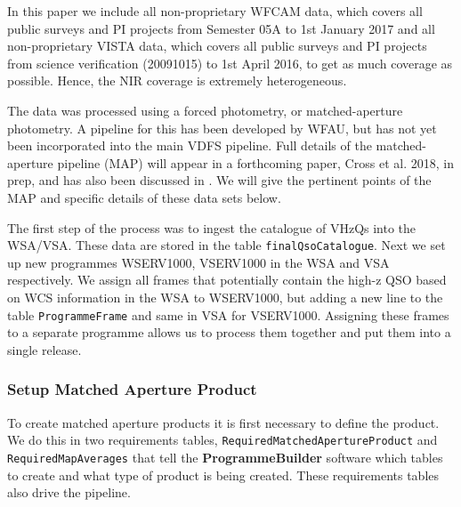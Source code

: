 \documentclass[usenatbib]{mnras}
\begin{document}
In this paper we include all non-proprietary WFCAM data, which covers all
public surveys and PI projects from Semester 05A to 1st January 2017 and all
non-proprietary VISTA data, which covers all public surveys and PI projects from
science verification (20091015) to 1st April 2016, to get as much coverage as
possible. Hence, the NIR coverage is extremely heterogeneous. 

The data was processed using a forced photometry, or matched-aperture
photometry. A pipeline for this has been developed by WFAU, but
has not yet been incorporated into the main VDFS pipeline. Full details of the
matched-aperture pipeline (MAP) will appear in a forthcoming paper, Cross et al.
2018, in prep, and has also been discussed in \citet{Cross2013}.  
We will give the pertinent points of the MAP and specific details of these data sets below.
   
The first step of the process was to ingest the catalogue of VHzQs into
the WSA/VSA. These data are stored in the table \verb+finalQsoCatalogue+. Next we set
up new programmes WSERV1000, VSERV1000 in the WSA and VSA respectively. We
assign all frames that potentially contain the high-z QSO based on WCS information in the
WSA to WSERV1000, but adding a new line to the table \verb+ProgrammeFrame+ and
same in VSA for VSERV1000. Assigning these frames to a separate programme allows
us to process them together and put them into a single release. 
    
\subsubsection{Setup Matched Aperture Product}
    
To create matched aperture products it is first necessary to define the product. We do this in two requirements tables, \verb+RequiredMatchedApertureProduct+ and \verb+RequiredMapAverages+ that
tell the \textbf{ProgrammeBuilder} software which tables to create and what type of product is being created. These requirements tables also drive the pipeline. 
\end{document}
